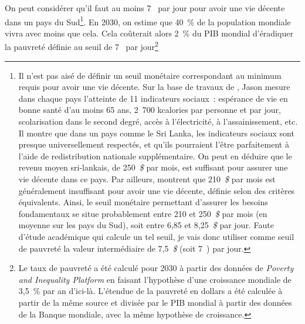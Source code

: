 \documentclass[a5paper,french,openany]{memoir}
\begin{document}
On peut considérer qu'il faut au moins 7~\textit{\texteuro{}} par jour pour avoir une vie décente dans un pays du Sud\footnote{Il n'est pas aisé %
de définir un seuil monétaire correspondant au minimum requis pour avoir une vie décente. Sur la base de travaux de \cite{oneill_good_2018}, Jason \cite{hickel_is_2019} mesure dans chaque pays l'atteinte de 11 indicateurs sociaux~: espérance de vie en bonne santé d'au moins 65 ans, 2~700 kcalories par personne et par jour, scolarisation dans le second degré, accès à l'électricité, à l'assainissement, etc. Il montre que dans un pays comme le Sri Lanka, les indicateurs sociaux sont presque universellement respectés, et qu'ils pourraient l'être parfaitement à l'aide de redistribution nationale supplémentaire. On peut en déduire que le revenu moyen sri-lankais, de 250~\textit{\$} 
par mois, %
est suffisant pour assurer une vie décente dans ce pays. Par ailleurs, \cite{kikstra_decent_2021} montrent que 210~\textit{\$} par mois %
est généralement insuffisant pour avoir une vie décente, définie selon des critères équivalents. Ainsi, le seuil monétaire permettant d'assurer les besoins fondamentaux se situe probablement entre 210 et 250~\textit{\$} par mois (en moyenne sur les pays du Sud), soit entre 6,85 et 8,25~\textit{\$} par jour. Faute d'étude académique qui calcule un tel seuil, je vais donc utiliser comme seuil de pauvreté la valeur intermédiaire de 7,5~\textit{\$} (soit 7~{\texteuro{}}) par jour.}. 
En 2030, on estime que 40~\% de la population mondiale vivra avec moins que cela. %
Cela coûterait alors 2~\% %
du PIB mondial d'éradiquer la pauvreté définie au seuil de 7~\textit{\texteuro{}} par jour\footnote{Le taux de pauvreté a été calculé pour 2030 à partir des données de \textit{Poverty and Inequality Platform} en faisant l'hypothèse d'une croissance mondiale de 3,5~\% par an d'ici-là. L'étendue de la pauvreté en dollars a été calculée à partir de la même source et divisée par le PIB mondial à partir des données de la Banque mondiale, avec la même hypothèse de croissance.}%
\end{document}
